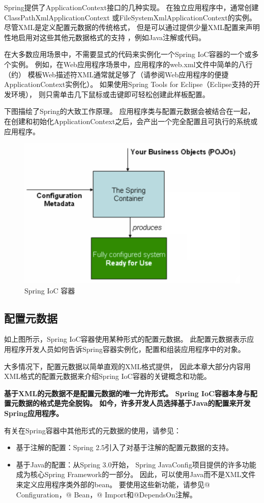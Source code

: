 Spring提供了ApplicationContext接口的几种实现。 
在独立应用程序中，通常创建ClassPathXmlApplicationContext
或FileSystemXmlApplicationContext的实例。 
尽管XML是定义配置元数据的传统格式，
但是可以通过提供少量XML配置来声明性地启用对这些其他元数据格式的支持
，例如Java注解或代码。

在大多数应用场景中，不需要显式的代码来实例化一个Spring IoC容器的一个或多个实例。 
例如，在Web应用程序场景中，应用程序的web.xml文件中简单的八行（约）
模板Web描述符XML通常就足够了（请参阅Web应用程序的便捷ApplicationContext实例化）。
 如果使用Spring Tools for Eclipse（Eclipse支持的开发环境），
 则只需单击几下鼠标或击键即可轻松创建此样板配置。

 下图描绘了Spring的大致工作原理。 
 应用程序类与配置元数据会被结合在一起，
 在创建和初始化ApplicationContext之后，会产出一个完全配置且可执行的系统或应用程序。

 \begin{figure}[ht]
    \centering
    \includegraphics[width=0.6\linewidth]{./Figure/IMG_process.png}
    \caption{Spring IoC 容器}\label{Fig:xd1}
  \end{figure}

\subsection{配置元数据}
如上图所示，Spring IoC容器使用某种形式的配置元数据。 
此配置元数据表示应用程序开发人员如何告诉Spring容器实例化，配置和组装应用程序中的对象。

大多情况下，配置元数据以简单直观的XML格式提供，
因此本章大部分内容用XML格式的配置元数据来介绍Spring IoC容器的关键概念和功能。

\textbf{基于XML的元数据不是配置元数据的唯一允许形式。 Spring IoC容器本身与配置元数据的格式是完全脱钩。 如今，许多开发人员选择基于Java的配置来开发Spring应用程序。}

有关在Spring容器中其他形式的元数据的使用，请参见：

\begin{itemize}
    \item 基于注解的配置：Spring 2.5引入了对基于注解的配置元数据的支持。
    \item 基于Java的配置：从Spring 3.0开始，
    Spring JavaConfig项目提供的许多功能成为核心Spring Framework的一部分。 
    因此，可以使用Java而不是XML文件来定义应用程序类外部的bean。
     要使用这些新功能，请参见@ Configuration，@ Bean，@ Import和@DependsOn注解。
\end{itemize}

